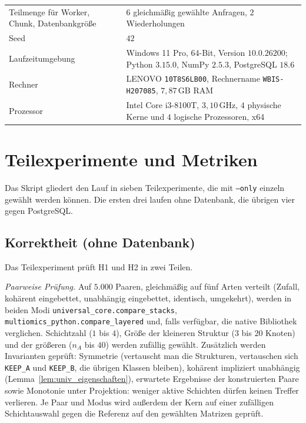 \documentclass[a4paper,12pt, twoside]{report}
\theoremstyle{definition}
\begin{document}
\begin{table}[!ht]
\begin{tabular}{@{}>{\raggedright\arraybackslash}p{5.2cm}>{\raggedright\arraybackslash}p{8.8cm}@{}}
		Teilmenge für Worker, Chunk, Datenbankgröße & $6$ gleichmäßig gewählte Anfragen, $2$ Wiederholungen \\
		Seed & $42$ \\
		Laufzeitumgebung & Windows 11 Pro, 64-Bit, Version $10.0.26200$; Python $3.15.0$, NumPy $2.5.3$, PostgreSQL $18.6$ \\
		Rechner & LENOVO \texttt{10T8S6LB00}, Rechnername \texttt{WBIS-H207085}, $7{,}87\,\mathrm{GB}$ RAM \\
		Prozessor & Intel Core i3-8100T, $3{,}10\,\mathrm{GHz}$, $4$ physische Kerne und $4$ logische Prozessoren, x64 \\
		\bottomrule
	\end{tabular}
\end{table}

\section{Teilexperimente und Metriken}
\label{sec:ucx_teilexperimente}

Das Skript gliedert den Lauf in sieben Teilexperimente, die mit \texttt{--only} einzeln gewählt werden können. Die ersten drei laufen ohne Datenbank, die übrigen vier gegen PostgreSQL.

\subsection{Korrektheit (ohne Datenbank)}
\label{sec:ucx_korrektheit}

Das Teilexperiment prüft H1 und H2 in zwei Teilen.

\emph{Paarweise Prüfung.} Auf $5.000$ Paaren, gleichmäßig auf fünf Arten verteilt (Zufall, kohärent eingebettet, unabhängig eingebettet, identisch, umgekehrt), werden in beiden Modi \texttt{universal\_core.compare\_stacks}, \texttt{multiomics\_python.compare\_layered} und, falls verfügbar, die native Bibliothek verglichen. Schichtzahl ($1$ bis $4$), Größe der kleineren Struktur ($3$ bis $20$ Knoten) und der größeren ($n_A$ bis $40$) werden zufällig gewählt. Zusätzlich werden Invarianten geprüft: Symmetrie (vertauscht man die Strukturen, vertauschen sich \texttt{KEEP\_A} und \texttt{KEEP\_B}, die übrigen Klassen bleiben), kohärent impliziert unabhängig (Lemma~\ref{lem:univ_eigenschaften}), erwartete Ergebnisse der konstruierten Paare sowie Monotonie unter Projektion: weniger aktive Schichten dürfen keinen Treffer verlieren. Je Paar und Modus wird außerdem der Kern auf einer zufälligen Schichtauswahl gegen die Referenz auf den gewählten Matrizen geprüft.
\end{document}
